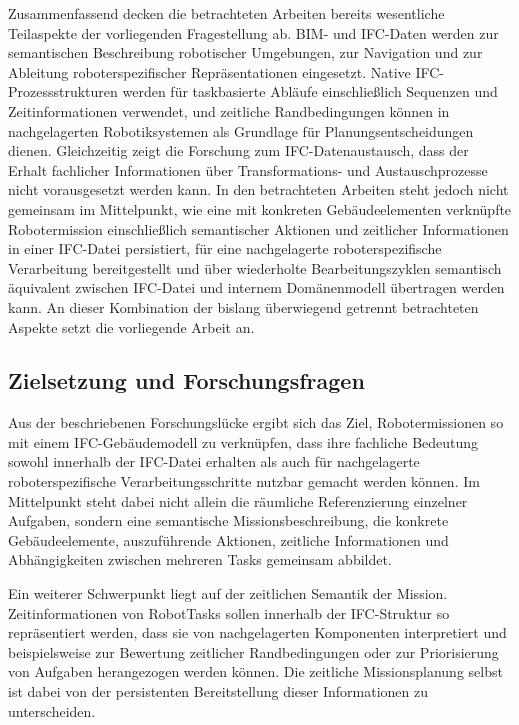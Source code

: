 Zusammenfassend decken die betrachteten Arbeiten bereits wesentliche Teilaspekte der vorliegenden
Fragestellung ab. BIM- und IFC-Daten werden zur semantischen Beschreibung robotischer Umgebungen,
zur Navigation und zur Ableitung roboterspezifischer Repräsentationen eingesetzt. Native
IFC-Prozessstrukturen werden für taskbasierte Abläufe einschließlich Sequenzen und Zeitinformationen
verwendet, und zeitliche Randbedingungen können in nachgelagerten Robotiksystemen als Grundlage für
Planungsentscheidungen dienen. Gleichzeitig zeigt die Forschung zum IFC-Datenaustausch, dass der
Erhalt fachlicher Informationen über Transformations- und Austauschprozesse nicht vorausgesetzt
werden kann. In den betrachteten Arbeiten steht jedoch nicht gemeinsam im Mittelpunkt, wie eine mit
konkreten Gebäudeelementen verknüpfte Robotermission einschließlich semantischer Aktionen und
zeitlicher Informationen in einer IFC-Datei persistiert, für eine nachgelagerte roboterspezifische
Verarbeitung bereitgestellt und über wiederholte Bearbeitungszyklen semantisch äquivalent zwischen
IFC-Datei und internem Domänenmodell übertragen werden kann. An dieser Kombination der bislang
überwiegend getrennt betrachteten Aspekte setzt die vorliegende Arbeit an.

\subsection{Zielsetzung und Forschungsfragen}

Aus der beschriebenen Forschungslücke ergibt sich das Ziel, Robotermissionen so mit einem
IFC-Gebäudemodell zu verknüpfen, dass ihre fachliche Bedeutung sowohl innerhalb der IFC-Datei
erhalten als auch für nachgelagerte roboterspezifische Verarbeitungsschritte nutzbar gemacht werden
können. Im Mittelpunkt steht dabei nicht allein die räumliche Referenzierung einzelner Aufgaben,
sondern eine semantische Missionsbeschreibung, die konkrete Gebäudeelemente, auszuführende Aktionen,
zeitliche Informationen und Abhängigkeiten zwischen mehreren Tasks gemeinsam abbildet.

Ein weiterer Schwerpunkt liegt auf der zeitlichen Semantik der Mission. Zeitinformationen von
RobotTasks sollen innerhalb der IFC-Struktur so repräsentiert werden, dass sie von nachgelagerten
Komponenten interpretiert und beispielsweise zur Bewertung zeitlicher Randbedingungen oder zur
Priorisierung von Aufgaben herangezogen werden können. Die zeitliche Missionsplanung selbst ist
dabei von der persistenten Bereitstellung dieser Informationen zu unterscheiden.

